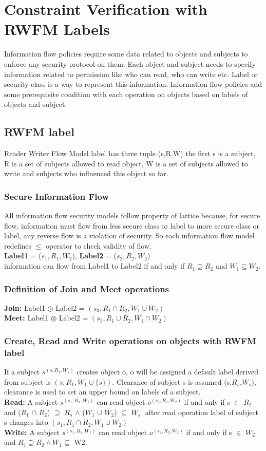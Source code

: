 \chapter{Constraint Verification with RWFM Labels}
\label{ch:label}
Information flow policies require some data related to objects and subjects to enforce any security protocol on them.
Each object and subject needs to specify information related to permission like who can read, who can write etc. Label or security class is a way to represent this information. Information flow policies add some prerequisite condition with each operation on objects based on labels of objects and subject.
\section{RWFM label \cite{rwfm}}
Reader Writer Flow Model label has three tuple (s,R,W)
the first s is a subject, R is a set of subjects allowed to read object, W is a set of subjects allowed to write and subjects who influenced this object so far. 
\subsection{Secure Information Flow}
All information flow security models follow property of lattice because, for secure flow, information must flow from less secure class or label to more secure class or label, any reverse flow is a violation of security.
So each information flow model redefines $\leqslant$ operator to check validity of flow.\\
\textbf{Label1} = ($s_1,R_1,W_2$), \textbf{Label2} = ($s_2,R_2,W_2$)\\
information can flow from Label1 to Label2 if and only if $R_1 \supseteq R_2$ and $W_1 \subseteq W_2$.  
\subsection{Definition of Join and Meet operations \cite{rwfm}}
\textbf{Join:} Label1 $\oplus$ Label2 = $(s_3,R_1 \cap R_2, W_1 \cup W_2)$\\
\hspace*{0.6cm}\textbf{Meet:} Label1 $\otimes$ Label2 = $(s_3,R_1 \cup R_2, W_1 \cap W_2)$
\subsection{Create, Read and Write operations on objects with RWFM label \cite{rwfm}}
If a subject $s^{(s,R_1,W_1)}$ creates object o, o will be assigned a default label derived from subject is $(s,R_1,W_1 \cup \{s\})$.
Clearance of subject s is assumed (s,$R_s$,$W_s$), clearance is used to set an upper bound on labels of a subject.\\
\textbf{Read:} A subject $s^{(s_1,R_1,W_1)}$ can read object $o^{(s_2,R_2,W_2)}$ if and only if s $\in$ $R_2$ and ($R_1$ $\cap$ $R_2$) $\supseteq$ $R_s$ $\land$ ($W_1$ $\cup$ $W_2$) $\subseteq$ $W_s$. after read operation label of subject s changes into $(s_1,R_1 \cap R_2, W_1 \cup W_2)$\\
 \textbf{Write:} A subject $s^{(s_1,R_1,W_1)}$ can read object $o^{(s_2,R_2,W_2)}$ if and only if s $\in$ $W_2$ and $R_1 \supseteq R_2 \land W_1 \subseteq$ W2. 
